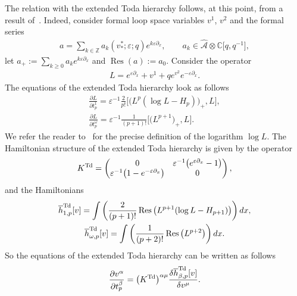\documentclass[pdftex]{sigma}
\numberwithin{equation}{section}
\newcommand{\mbC}{\mathbb C}
\newcommand{\oh}{\overline h}
\def\d{{\partial}}
\newcommand{\<}{\left<}
\renewcommand{\>}{\right>}
\newcommand{\eps}{\varepsilon}
\newcommand{\hcA}{\widehat{\mathcal A}}
\newcommand{\Res}{\operatorname{Res}}
\begin{document}
The relation with the extended Toda hierarchy follows, at this point, from a result of~\cite{DZ05}. Indeed, consider formal loop space variables $v^1$, $v^2$ and the formal series
\begin{gather*}
a=\sum_{k\in\mathbb Z}a_k(v^*_*;\eps;q)e^{k\eps\d_x},\qquad a_k\in\hcA\otimes\mbC\big[q,q^{-1}\big],
\end{gather*}
let $a_+:=\sum\limits_{k\ge 0}a_k e^{k\eps\d_x}$ and $\Res(a):=a_0$. Consider the operator
\begin{gather*}
L=e^{\eps\d_x}+v^1+qe^{v^2}e^{-\eps\d_x}.
\end{gather*}
The equations of the extended Toda hierarchy look as follows
\begin{gather*}
\frac{\d L}{\d t^1_p}=\eps^{-1}\frac{2}{p!}\big[\big(L^p(\log L-H_p)\big)_+,L\big],\\
\frac{\d L}{\d t^\omega_p}=\eps^{-1}\frac{1}{(p+1)!}\big[\big(L^{p+1}\big)_+,L\big].
\end{gather*}
We refer the reader to~\cite{DZ05} for the precise def\/inition of the logarithm $\log L$. The Hamiltonian structure of the extended Toda hierarchy is given by the operator
\begin{gather*}%
K^{\rm Td}=
\begin{pmatrix}
0 & \eps^{-1}\big(e^{\eps\d_x}-1\big) \\
\eps^{-1}\big(1-e^{-\eps\d_x}\big) & 0
\end{pmatrix},
\end{gather*}
and the Hamiltonians
\begin{gather*}
\oh^{\rm Td}_{1,p}[v]=\int\left(\frac{2}{(p+1)!}\Res\big(L^{p+1}(\log L-H_{p+1})\big)\right)dx,\\ %
\oh^{\rm Td}_{\omega,p}[v]=\int\left(\frac{1}{(p+2)!}\Res\big(L^{p+2}\big)\right)dx. %
\end{gather*}
So the equations of the extended Toda hierarchy can be written as follows
\begin{gather*}
\frac{\d v^\alpha}{\d t^\beta_p}=\big(K^{\rm Td}\big)^{\alpha\mu}\frac{\delta\oh^{\rm Td}_{\beta,p}[v]}{\delta v^\mu}.
\end{gather*}
\end{document}
